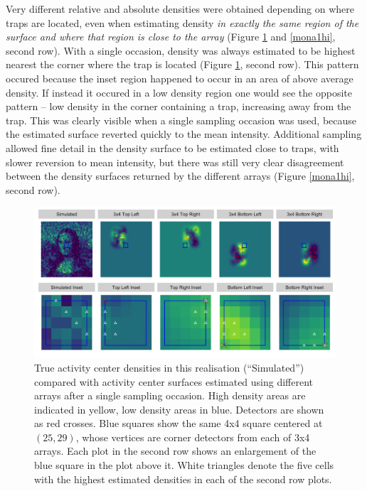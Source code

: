 \documentclass[a4paper,12pt]{article}
\begin{document}
Very different relative and absolute densities were obtained depending on where traps are located, even when estimating density {\it in exactly the same region of the surface and where that region is close to the array} (Figure \ref{mona1low} and \ref{mona1hi}, second row). With a single occasion, density was always estimated to be highest nearest the corner where the trap is located (Figure \ref{mona1low}, second row). This pattern occured because the inset region happened to occur in an area of above average density. If instead it occured in a low density region one would see the opposite pattern -- low density in the corner containing a trap, increasing away from the trap. This was clearly visible when a single sampling occasion was used, because the estimated surface reverted quickly to the mean intensity. Additional sampling allowed fine detail in the density surface to be estimated close to traps, with slower reversion to mean intensity, but there was still very clear disagreement between the density surfaces returned by the different arrays (Figure \ref{mona1hi}, second row).

\begin{figure}[htbp]
\centering
\includegraphics[width=1\textwidth]{many_faces_mona_loweffort.png}
\caption{True activity center densities in this realisation (``Simulated'') compared with activity center surfaces estimated using different arrays after a single sampling occasion. High density areas are indicated in yellow, low density areas in blue. Detectors are shown as red crosses. Blue squares show the same 4x4 square centered at $(25,29)$, whose vertices are corner detectors from each of 3x4 arrays. Each plot in the second row shows an enlargement of the blue square in the plot above it. White triangles denote the five cells with the highest estimated densities in each of the second row plots.}
\label{mona1low}
\end{figure}
\end{document}
